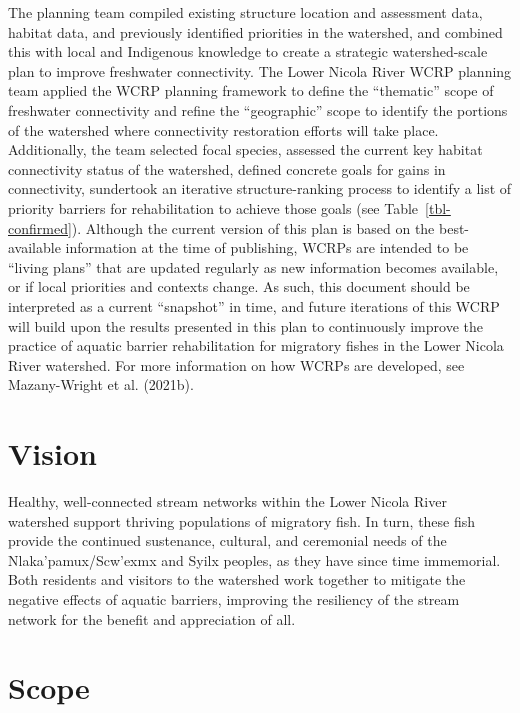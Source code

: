 \documentclass[
  letterpaper,
  DIV=11,
  numbers=noendperiod]{scrreprt}
\begin{document}
The planning team compiled existing structure location and assessment
data, habitat data, and previously identified priorities in the
watershed, and combined this with local and Indigenous knowledge to
create a strategic watershed-scale plan to improve freshwater
connectivity. The Lower Nicola River WCRP planning team applied the WCRP
planning framework to define the ``thematic'' scope of freshwater
connectivity and refine the ``geographic'' scope to identify the
portions of the watershed where connectivity restoration efforts will
take place. Additionally, the team selected focal species, assessed the
current key habitat connectivity status of the watershed, defined
concrete goals for gains in connectivity, sundertook an iterative
structure-ranking process to identify a list of priority barriers for
rehabilitation to achieve those goals (see Table~\ref{tbl-confirmed}).
Although the current version of this plan is based on the best-available
information at the time of publishing, WCRPs are intended to be ``living
plans'' that are updated regularly as new information becomes available,
or if local priorities and contexts change. As such, this document
should be interpreted as a current ``snapshot'' in time, and future
iterations of this WCRP will build upon the results presented in this
plan to continuously improve the practice of aquatic barrier
rehabilitation for migratory fishes in the Lower Nicola River watershed.
For more information on how WCRPs are developed, see Mazany-Wright et
al. (2021b).

\hypertarget{vision}{%
\section*{Vision}\label{vision}}


Healthy, well-connected stream networks within the Lower Nicola River
watershed support thriving populations of migratory fish. In turn, these
fish provide the continued sustenance, cultural, and ceremonial needs of
the Nlaka'pamux/Scw'exmx and Syilx peoples, as they have since time
immemorial. Both residents and visitors to the watershed work together
to mitigate the negative effects of aquatic barriers, improving the
resiliency of the stream network for the benefit and appreciation of
all.

\hypertarget{scope}{%
\section*{Scope}\label{scope}}
\end{document}
